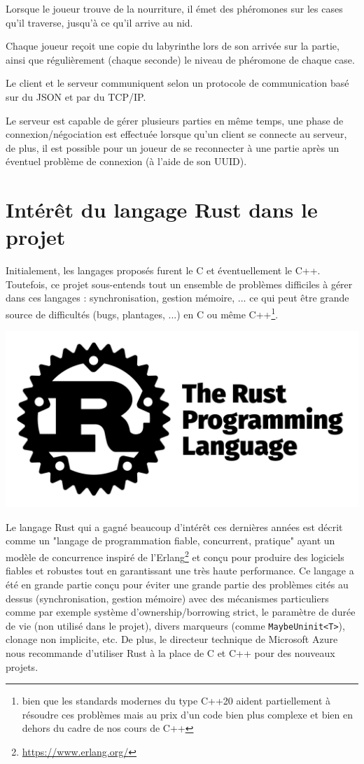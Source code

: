 \documentclass{EPUProjetDi}
\begin{document}
Lorsque le joueur trouve de la nourriture, il émet des phéromones sur les cases qu'il traverse, jusqu'à ce qu'il arrive au nid.

Chaque joueur reçoit une copie du labyrinthe lors de son arrivée sur la partie, ainsi que régulièrement (chaque seconde) le niveau de phéromone de chaque case.

Le client et le serveur communiquent selon un protocole de communication basé sur du JSON et par du TCP/IP.

Le serveur est capable de gérer plusieurs parties en même temps, une phase de connexion/négociation est effectuée lorsque qu'un client se connecte au serveur, de plus, il est possible pour un joueur de se reconnecter à une partie après un éventuel problème de connexion (à l'aide de son UUID).

\section{Intérêt du langage Rust dans le projet}

Initialement, les langages proposés furent le C et éventuellement le C++. Toutefois, ce projet sous-entends tout un ensemble de problèmes difficiles à gérer dans ces langages : synchronisation, gestion mémoire, ... ce qui peut être grande source de difficultés (bugs, plantages, ...) en C ou même C++\footnote{bien que les standards modernes du type C++20 aident partiellement à résoudre ces problèmes mais au prix d'un code bien plus complexe et bien en dehors du cadre de nos cours de C++}.

\begin{center}
  \includegraphics[width=\linewidth/2]{rust-social-wide.jpg}
\end{center}

Le langage Rust qui a gagné beaucoup d'intérêt ces dernières années est décrit comme un "langage de programmation fiable, concurrent, pratique" ayant un modèle de concurrence inspiré de l'Erlang\footnote{\url{https://www.erlang.org/}} et conçu pour produire des logiciels fiables et robustes tout en garantissant une très haute performance. Ce langage a été en grande partie conçu pour éviter une grande partie des problèmes cités au dessus (synchronisation, gestion mémoire) avec des mécanismes particuliers comme par exemple système d'ownership/borrowing strict, le paramètre de durée de vie (non utilisé dans le projet), divers marqueurs (comme \verb|MaybeUninit<T>|), clonage non implicite, etc. De plus, le directeur technique de Microsoft Azure nous recommande d'utiliser Rust à la place de C et C++ pour des nouveaux projets\cite{markrussinovich}.
\end{document}
